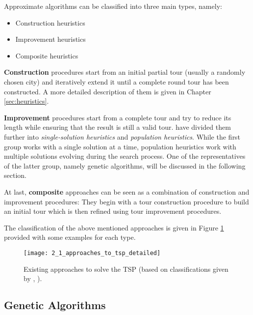  Approximate algorithms can be classified into three main types, namely:\par
 \begin{itemize}
 	\item Construction heuristics
 	\item Improvement heuristics
 	\item Composite heuristics	 
 \end{itemize}

  \textbf{Construction} procedures start from an initial partial tour (usually a randomly chosen city) and iteratively extend it until a complete round tour has been constructed. A more detailed description of them is given in Chapter \ref{sec:heuristics}.\par
  
  \textbf{Improvement} procedures start from a complete tour and try to reduce its length while ensuring that the result is still a valid tour. \citeauthor{gendreau2005metaheuristics} \cite{gendreau2005metaheuristics} have divided them further into \textit{single-solution heuristics} and \textit{population heuristics}. While the first group works with a single solution at a time, population heuristics work with multiple solutions evolving during the search process. One of the representatives of the latter group, namely genetic algorithms, will be discussed in the following section.\par 

  At last, \textbf{composite} approaches can be seen as a combination of construction and improvement procedures: They begin with a tour construction procedure to build an initial tour which is then refined using tour improvement procedures. 
  
  The classification of the above mentioned approaches is given in Figure \ref{2_1_approaches_to_tsp_detailed} provided with some examples for each type.
 
 \begin{figure}[htp] \centering
 	\centering
 	\texttt{[image: 2\_1\_approaches\_to\_tsp\_detailed]}
 	\caption{Existing approaches to solve the TSP (based on classifications given by \citeauthor{potvin1996genetic} \cite{potvin1996genetic}, \citeauthor{gendreau2005metaheuristics} \cite{gendreau2005metaheuristics}).}
 	\label{2_1_approaches_to_tsp_detailed}
 \end{figure}
 
\subsection{Genetic Algorithms}
\label{subsec:ga}

